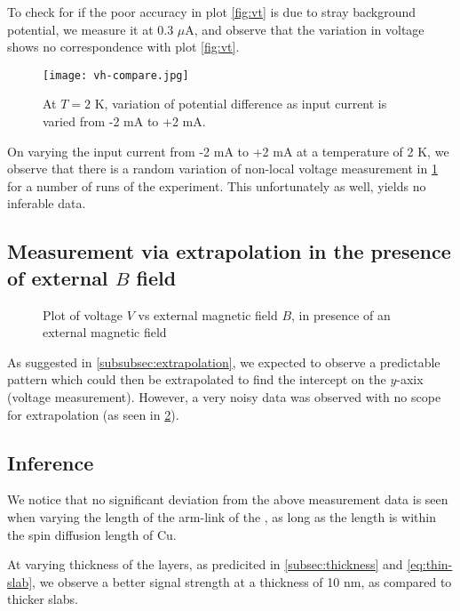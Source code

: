 To check for if the poor accuracy in plot \ref{fig:vt} is due to stray background potential, we measure it at 0.3 \( \mu \)A, and observe that the variation in voltage shows no correspondence with plot \ref{fig:vt}.

\begin{figure}[h!]
    \texttt{[image: vh-compare.jpg]}
    \caption{At \( T = 2 \) K, variation of potential difference as input current is varied from -2 mA to +2 mA.}
    \label{fig:vh-compare}
\end{figure}

On varying the input current from -2 mA to +2 mA at a temperature of 2 K, we observe that there is a random variation of non-local voltage measurement in \cref{fig:vh-compare} for a number of runs of the experiment. This unfortunately as well, yields no inferable data.


\clearpage

\subsection{Measurement via extrapolation in the presence of external \( B \) field}

\begin{figure}[!h]
    
    \caption{Plot of voltage \( V \) vs external magnetic field \( B \), in presence of an external magnetic field}
    \label{fig:b-extrapolation}
\end{figure}

As suggested in \cref{subsubsec:extrapolation}, we expected to observe a predictable pattern which could then be extrapolated to find the intercept on the \( y \)-axix (voltage measurement).
However, a very noisy data was observed with no scope for extrapolation (as seen in \cref{fig:b-extrapolation}).


\subsection{Inference}

We notice that no significant deviation from the above measurement data is seen when varying the length of the arm-link of the \Hst, as long as the length is within the spin diffusion length of Cu.

At varying thickness of the layers, as predicited in \cref{subsec:thickness} and \cref{eq:thin-slab}, we observe a better signal strength at a thickness of 10 nm, as compared to thicker slabs.
